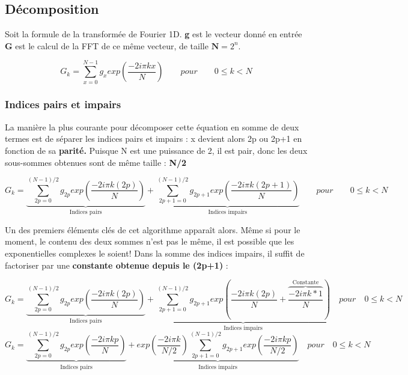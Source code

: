 \documentclass{article}
\begin{document}
\subsection{Décomposition}

Soit la formule de la transformée de Fourier 1D. \textbf{g} est le vecteur donné en entrée \textbf{G} est le calcul de la FFT de ce même vecteur, de taille $\textbf{N} = 2^{n}$.

\begin{equation}
	G_{k} = \sum_{x = 0}^{N-1}g_{x} exp(\frac{-2i\pi kx}{N}) \qquad pour \qquad 0 \leq k < N
\end{equation}

\subsubsection{Indices pairs et impairs}

La manière la plus courante pour décomposer cette équation en somme de deux termes est de séparer les indices pairs et impairs : x devient alors 2p ou 2p+1 en fonction de sa \textbf{parité.} Puisque N est une puissance de 2, il est pair, donc les deux sous-sommes obtenues sont de même taille : \textbf{N/2}

\begin{equation}
	G_{k} = \underbrace{\sum_{2p = 0}^{(N-1)/2}g_{2p} exp(\frac{-2i\pi k(2p)}{N})}_\text{Indices pairs} + \underbrace{\sum_{2p+1 = 0}^{(N-1)/2}g_{2p+1} exp(\frac{-2i\pi k(2p+1)}{N})}_\text{Indices impairs} \qquad pour \qquad 0 \leq k < N
\end{equation}

\newpage Un des premiers éléments clés de cet algorithme apparaît alors. Même si pour le moment, le contenu des deux sommes n'est pas le même, il est possible que les exponentielles complexes le soient! Dans la somme des indices impairs, il suffit de factoriser par une \textbf{constante obtenue depuis le (2p+1)} :

\begin{equation}
	G_{k} = \underbrace{\sum_{2p = 0}^{(N-1)/2}g_{2p} exp(\frac{-2i\pi k(2p)}{N})}_\text{Indices pairs} + \underbrace{  \sum_{2p+1 = 0}^{(N-1)/2}g_{2p+1} exp(\frac{-2i\pi k(2p)}{N} + \overbrace{\frac{-2i\pi k*1}{N}}^\text{Constante} )  }_\text{Indices impairs} \quad pour \quad 0 \leq k < N
\end{equation}
\begin{equation}
	G_{k} = \underbrace{\sum_{2p = 0}^{(N-1)/2}g_{2p} exp(\frac{-2i\pi kp}{N})}_\text{Indices pairs} + \underbrace{exp(\frac{-2i\pi k}{N/2})\sum_{2p+1 = 0}^{(N-1)/2}g_{2p+1} exp(\frac{-2i\pi k	p}{N/2})}_\text{Indices impairs} \quad pour \quad 0 \leq k < N
\end{equation}
\end{document}
